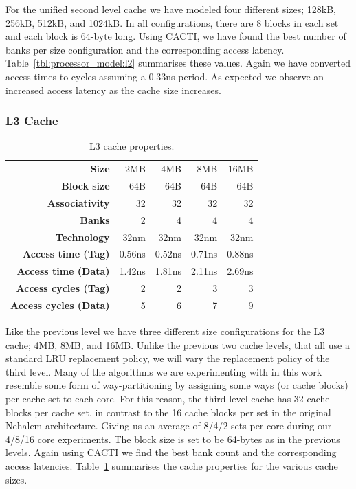 For the unified second level cache we have modeled four different sizes; 128kB, 256kB, 512kB, and 1024kB. 
In all configurations, there are 8 blocks in each set and each block is 64-byte long.
Using CACTI, we have found the best number of banks per size configuration and the corresponding access latency.
Table~\ref{tbl:processor_model:l2} summarises these values. 
Again we have converted access times to cycles assuming a 0.33ns period.
As expected we observe an increased access latency as the cache size increases.

\subsubsection{L3 Cache}
\begin{table}[ht]
\centering
\begin{tabular}{rrrrr}
\toprule
\bf{Size}                 & 2MB         & 4MB         & 8MB         & 16MB       \\
\bf{Block size}           & 64B         & 64B         & 64B         & 64B         \\
\bf{Associativity}        & 32          & 32          & 32          & 32             \\
\bf{Banks}                & 2           & 4           & 4           & 4           \\
\bf{Technology}           & 32nm        & 32nm        & 32nm        & 32nm    \\
\bf{Access time (Tag)}    & 0.56ns      & 0.52ns      & 0.71ns      & 0.88ns   \\
\bf{Access time (Data)}   & 1.42ns      & 1.81ns      & 2.11ns      & 2.69ns     \\
\bf{Access cycles (Tag)}  & 2           & 2           & 3           & 3             \\
\bf{Access cycles (Data)} & 5           & 6           & 7           & 9      \\
\bottomrule
\end{tabular}
\caption{L3 cache properties.}
\label{tbl:processor_model:l3}
\end{table}

Like the previous level we have three different size configurations for the L3 cache; 4MB, 8MB, and 16MB.
Unlike the previous two cache levels, that all use a standard LRU replacement policy, we will vary the replacement policy of the third level.
Many of the algorithms we are experimenting with in this work resemble some form of way-partitioning by assigning some ways (or cache blocks) per cache set to each core.
For this reason, the third level cache has 32 cache blocks per cache set, in contrast to the 16 cache blocks per set in the original Nehalem architecture.
Giving us an average of 8/4/2 sets per core during our 4/8/16 core experiments.
The block size is set to be 64-bytes as in the previous levels.
Again using CACTI we find the best bank count and the corresponding access latencies.
Table~\ref{tbl:processor_model:l3} summarises the cache properties for the various cache sizes.